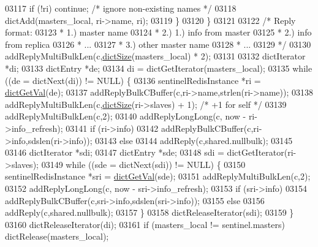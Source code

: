 \begin{DoxyCode}
{{{{{{{{{{{{{{{{{{{{{{{{{{{{{{{{{{{{{{{{{{{{{{{{{{{{{{{{{{{{{{03117                 \textcolor{keywordflow}{if} (!ri) \textcolor{keywordflow}{continue}; \textcolor{comment}{/* ignore non-existing names */}
03118                 dictAdd(masters\_local, ri->name, ri);
03119             \}
03120         \}
03121 
03122         \textcolor{comment}{/* Reply format:}
03123 \textcolor{comment}{         *   1.) master name}
03124 \textcolor{comment}{         *   2.) 1.) info from master}
03125 \textcolor{comment}{         *       2.) info from replica}
03126 \textcolor{comment}{         *       ...}
03127 \textcolor{comment}{         *   3.) other master name}
03128 \textcolor{comment}{         *   ...}
03129 \textcolor{comment}{         */}
03130         addReplyMultiBulkLen(c,\hyperlink{dict_8h_af193430dd3d5579a52b194512f72c1f0}{dictSize}(masters\_local) * 2);
03131 
03132         dictIterator  *di;
03133         dictEntry *de;
03134         di = dictGetIterator(masters\_local);
03135         \textcolor{keywordflow}{while} ((de = dictNext(di)) != NULL) \{
03136             sentinelRedisInstance *ri = \hyperlink{dict_8h_ae8d2cc391873b2bea2b87c4f80f43120}{dictGetVal}(de);
03137             addReplyBulkCBuffer(c,ri->name,strlen(ri->name));
03138             addReplyMultiBulkLen(c,\hyperlink{dict_8h_af193430dd3d5579a52b194512f72c1f0}{dictSize}(ri->slaves) + 1); \textcolor{comment}{/* +1 for self */}
03139             addReplyMultiBulkLen(c,2);
03140             addReplyLongLong(c, now - ri->info\_refresh);
03141             \textcolor{keywordflow}{if} (ri->info)
03142                 addReplyBulkCBuffer(c,ri->info,sdslen(ri->info));
03143             \textcolor{keywordflow}{else}
03144                 addReply(c,shared.nullbulk);
03145 
03146             dictIterator *sdi;
03147             dictEntry *sde;
03148             sdi = dictGetIterator(ri->slaves);
03149             \textcolor{keywordflow}{while} ((sde = dictNext(sdi)) != NULL) \{
03150                 sentinelRedisInstance *sri = \hyperlink{dict_8h_ae8d2cc391873b2bea2b87c4f80f43120}{dictGetVal}(sde);
03151                 addReplyMultiBulkLen(c,2);
03152                 addReplyLongLong(c, now - sri->info\_refresh);
03153                 \textcolor{keywordflow}{if} (sri->info)
03154                     addReplyBulkCBuffer(c,sri->info,sdslen(sri->info));
03155                 \textcolor{keywordflow}{else}
03156                     addReply(c,shared.nullbulk);
03157             \}
03158             dictReleaseIterator(sdi);
03159         \}
03160         dictReleaseIterator(di);
03161         \textcolor{keywordflow}{if} (masters\_local != sentinel.masters) dictRelease(masters\_local);
}}}}}}}}}}}}}}}}}}}}}}}}}}}}}}}}}}}}}}}}}}}}}}}}}}}}}}}}}}}}}}
\end{DoxyCode}
